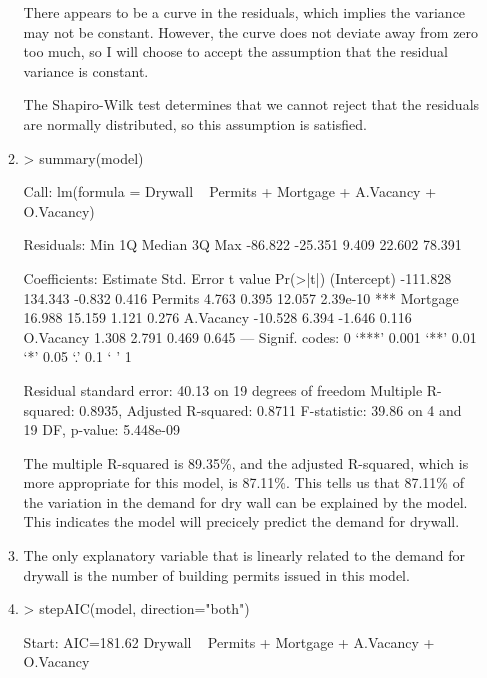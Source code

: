 \documentclass[]{article}
\begin{document}
\begin{enumerate}
\begin{enumerate}
There appears to be a curve in the residuals, which implies the variance may not be constant. However, the curve does not deviate away from zero too much, so I will choose to accept the assumption that the residual variance is constant.

The Shapiro-Wilk test determines that we cannot reject that the residuals are normally distributed, so this assumption is satisfied.

\item

\begin{Schunk}
\begin{Sinput}
> summary(model)
\end{Sinput}
\begin{Soutput}
Call:
lm(formula = Drywall ~ Permits + Mortgage + A.Vacancy + O.Vacancy)

Residuals:
    Min      1Q  Median      3Q     Max 
-86.822 -25.351   9.409  22.602  78.391 

Coefficients:
            Estimate Std. Error t value Pr(>|t|)    
(Intercept) -111.828    134.343  -0.832    0.416    
Permits        4.763      0.395  12.057 2.39e-10 ***
Mortgage      16.988     15.159   1.121    0.276    
A.Vacancy    -10.528      6.394  -1.646    0.116    
O.Vacancy      1.308      2.791   0.469    0.645    
---
Signif. codes:  0 ‘***’ 0.001 ‘**’ 0.01 ‘*’ 0.05 ‘.’ 0.1 ‘ ’ 1

Residual standard error: 40.13 on 19 degrees of freedom
Multiple R-squared:  0.8935,	Adjusted R-squared:  0.8711 
F-statistic: 39.86 on 4 and 19 DF,  p-value: 5.448e-09
\end{Soutput}
\end{Schunk}

The multiple R-squared is 89.35\%, and the adjusted R-squared, which is more appropriate for this model, is 87.11\%. This tells us that 87.11\% of the variation in the demand for dry wall can be explained by the model. This indicates the model will precicely predict the demand for drywall.

\item

The only explanatory variable that is linearly related to the demand for drywall is the number of building permits issued in this model.

\item
\begin{Schunk}
\begin{Sinput}
> stepAIC(model, direction="both")
\end{Sinput}
\begin{Soutput}
Start:  AIC=181.62
Drywall ~ Permits + Mortgage + A.Vacancy + O.Vacancy


\end{Soutput}
\end{Schunk}
\end{enumerate}
\end{enumerate}
\end{document}

